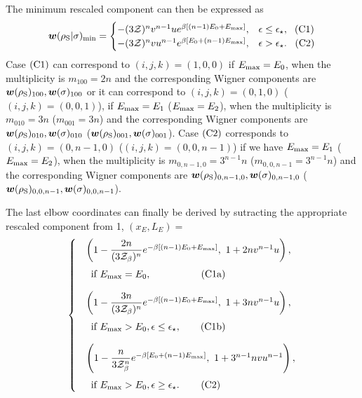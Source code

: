 The minimum rescaled component can then be expressed as
\begin{equation}
\bm{w}(\rho_{\rm{S}} | \sigma)_{\rm{min}} =
	\begin{cases}
		-(3\mathcal{Z})^{n} v^{n-1} u e^{\beta [(n-1)E_0 + E_{\rm{max}}]}, &\epsilon \leq \epsilon_{\star},\ \hspace{3pt}\rm{(C1)}	\\
		-(3\mathcal{Z})^{n} v u^{n-1} e^{\beta [E_0 + (n-1)E_{\rm{max}}]}, &\epsilon > \epsilon_{\star}.\ \hspace{5pt}\rm{(C2)} 
	\end{cases}
\end{equation}
Case $\rm{(C1)}$ can correspond to $(i,j,k) = (1,0,0)$ if $E_{\rm{max}} = E_0$, when the multiplicity is $m_{100} = 2n$ and the corresponding Wigner components are $\bm{w}(\rho_{\rm{S}})_{100}, \bm{w}(\sigma)_{100}$ or it can correspond to $(i,j,k) = (0,1,0)$ ($(i,j,k) = (0,0,1)$), if $E_{\rm{max}} = E_1$ ($E_{\rm{max}} = E_2$), when the multiplicity is $m_{010} = 3n$ ($m_{001} = 3n$) and the corresponding Wigner components are $\bm{w}(\rho_{\rm{S}})_{010}, \bm{w}(\sigma)_{010}$ ($\bm{w}(\rho_{\rm{S}})_{001}, \bm{w}(\sigma)_{001}$).
Case $\rm{(C2)}$ corresponds to $(i,j,k) = (0,n-1,0)$ ($(i,j,k) = (0,0,n-1)$)
if we have $E_{\rm{max}} = E_1$ ($E_{\rm{max}} = E_2$), when the multiplicity is $m_{0,n-1,0} = 3^{n-1}n$ ($m_{0,0,n-1} = 3^{n-1}n$) and the corresponding Wigner components are $\bm{w}(\rho_{\rm{S}})_{0,n-1,0}, \bm{w}(\sigma)_{0,n-1,0}$ ($\bm{w}(\rho_{\rm{S}})_{0,0,n-1}, \bm{w}(\sigma)_{0,0,n-1}$).

The last elbow coordinates can finally be derived by sutracting the appropriate rescaled component from 1, $(x_E, L_E) =$
\begin{equation}\label{eq:last_elb_coords}
	\begin{cases}
		&\left( 1-\dfrac{2n}{(3\Z_\beta)^n}e^{-\beta [(n-1)E_0 + E_{\rm{max}}]},\ 1 + 2n v^{n-1} u \right), \vspace{5pt}\\
		&\hspace{5pt} \text{if } E_{\rm{max}} = E_0, \hspace{51pt}\rm{(C1a)} \vspace{10pt}\\
		&\left( 1-\dfrac{3n}{(3\Z_\beta)^n}e^{-\beta [(n-1)E_0 + E_{\rm{max}}]},\ 1 + 3n v^{n-1} u \right), \vspace{5pt}\\
		&\hspace{5pt} \text{if } E_{\rm{max}} > E_0, \epsilon \leq \epsilon_{\star}, \hspace{20pt}\rm{(C1b)} \vspace{10pt}\\
		&\left( 1-\dfrac{n}{3\Z_\beta^n}e^{-\beta [E_0 + (n-1)E_{\rm{max}}]},\ 1 + 3^{n-1}n v u^{n-1} \right), \vspace{5pt}\\
		&\hspace{5pt} \text{if } E_{\rm{max}} > E_0, \epsilon \geq \epsilon_{\star}. \hspace{22pt}\rm{(C2)}
	\end{cases}
\end{equation}

